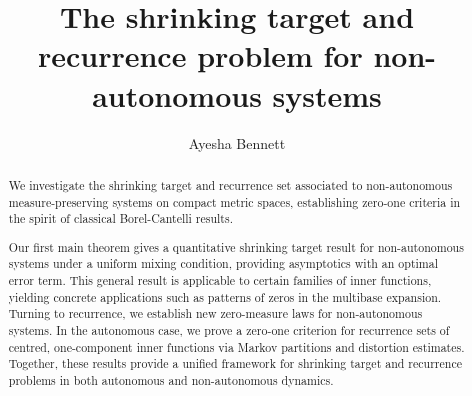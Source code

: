 \documentclass[11pt,reqno]{amsart}
\newcommand{\0}{\mathbf{0}}
\theoremstyle{remark}
\numberwithin{equation}{section}
\theoremstyle{remark}
\numberwithin{equation}{section}
\begin{document}
 \author{Ayesha Bennett}


\bigskip

\date{}




\begin{abstract}
We investigate the shrinking target and recurrence set associated to non-autonomous measure-preserving systems on compact metric spaces, establishing zero-one criteria in the spirit of classical Borel-Cantelli results.

Our first main theorem gives a quantitative shrinking target result for non-autonomous systems under a uniform mixing condition, providing asymptotics with an optimal error term. This general result is applicable to certain families of inner functions, yielding concrete applications such as patterns of zeros in the multibase expansion.
Turning to recurrence, we establish new zero-measure laws for non-autonomous systems. In the autonomous case, we prove a zero-one criterion for recurrence sets of centred, one-component inner functions via Markov partitions and distortion estimates. Together, these results provide a unified framework for shrinking target and recurrence problems in both autonomous and non-autonomous dynamics.
\end{abstract}


\title{ The shrinking target and recurrence problem for  non-autonomous systems }
 \maketitle
\end{document}
